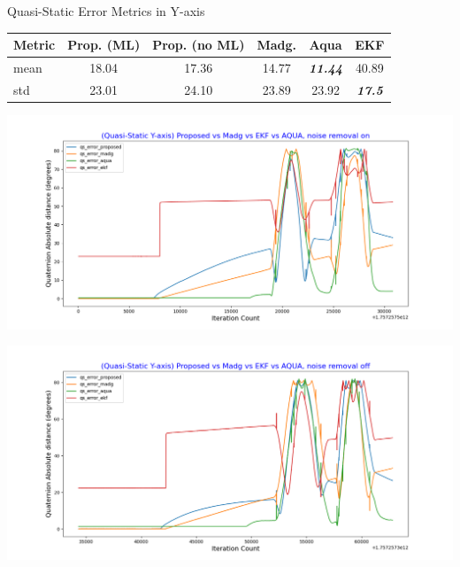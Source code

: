 \documentclass[aspectratio=169,xcolor=dvipsnames]{beamer}
\begin{document}
\begin{frame}{Quasi-Static Error Metrics in Y-axis}
\small
\begin{minipage}{\textwidth}
  \centering
  \scriptsize
  \label{tab:quasi_static_y}
  \begin{tabular}{lccccc}
    \toprule
    Metric & Prop. (ML) & Prop. (no ML) & Madg. & Aqua & EKF \\
    \midrule
    mean & 18.04 & 17.36 & 14.77 & \textit{\textbf{11.44}} & 40.89 \\
    std & 23.01 & 24.10 & 23.89 & 23.92 & \textit{\textbf{17.5}} \\
    \bottomrule
  \end{tabular}
\end{minipage}

\vspace{0.5cm}

\begin{minipage}{0.5\textwidth}
  \centering
  \includegraphics[width=\linewidth,height=0.35\textheight]{graphs/qs_ml_y.png}
\end{minipage}%
\hfill
\begin{minipage}{0.5\textwidth}
  \centering
  \includegraphics[width=\linewidth]{graphs/qs_no_ml_y.png}
\end{minipage}

\end{frame}
\end{document}
